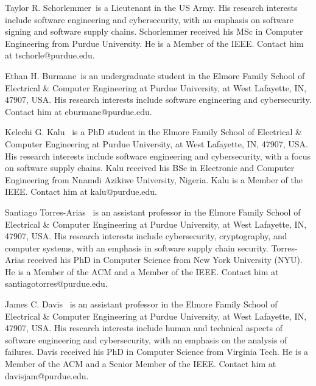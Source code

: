 \documentclass{IEEEcsmagTechrxiv}
\begin{document}
 \begin{IEEEbiography}{Taylor R. Schorlemmer}{\,}
 is a Lieutenant in the US Army.
 His research interests include software engineering and cybersecurity, with an emphasis on software signing and software supply chains.
 Schorlemmer received his MSc in Computer Engineering from Purdue University.
 He is a Member of the IEEE.
 Contact him at tschorle@purdue.edu.
 \end{IEEEbiography}

 \begin{IEEEbiography}{Ethan H. Burmane}{\,} is an undergraduate student in the Elmore Family School of Electrical \& Computer Engineering at Purdue University, at West Lafayette, IN, 47907, USA.
 His research interests include software engineering and cybersecurity.
 Contact him at eburmane@purdue.edu.
 \end{IEEEbiography}

 \begin{IEEEbiography}{Kelechi G. Kalu} {\,}
 is a PhD student in the Elmore Family School of Electrical \& Computer Engineering at Purdue University, at West Lafayette, IN, 47907, USA.
 His research interests include software engineering and cybersecurity, with a focus on software supply chains.
 Kalu received his BSc in Electronic and Computer Engineering from Nnamdi Azikiwe University, Nigeria.
 Kalu is a Member of the IEEE.
 Contact him at kalu@purdue.edu.
 \end{IEEEbiography}
 
 \begin{IEEEbiography}{Santiago Torres-Arias} {\,}
 is an assistant professor in the Elmore Family School of Electrical \& Computer Engineering at Purdue University, at West Lafayette, IN, 47907, USA.
 His research interests include cybersecurity, cryptography, and computer systems, with an emphasis in software supply chain security.
 Torres-Arias received his PhD in Computer Science from New York University (NYU).
 He is a Member of the ACM and a Member of the IEEE.
 Contact him at santiagotorres@purdue.edu.
 \end{IEEEbiography}
 
 \begin{IEEEbiography}{James C. Davis} {\,}
 is an assistant professor in the Elmore Family School of Electrical \& Computer Engineering at Purdue University, at West Lafayette, IN, 47907, USA.
 His research interests include human and technical aspects of software engineering and cybersecurity, with an emphasis on the analysis of failures.
 Davis received his PhD in Computer Science from Virginia Tech.
 He is a Member of the ACM and a Senior Member of the IEEE.
 Contact him at davisjam@purdue.edu.
\vadjust{\vfill\pagebreak}
 \end{IEEEbiography}
 
\end{document}
